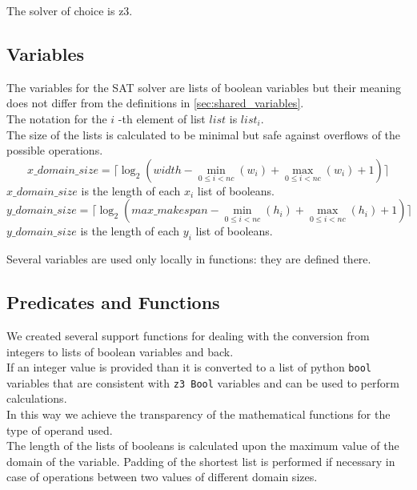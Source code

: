     The solver of choice is z3.


\subsection{Variables}\label{subsec:SAT_variables}
  The variables for the SAT solver are lists of boolean variables but their meaning does not differ from the 
  definitions in \ref{sec:shared_variables}.\\

  The notation for the \(i\) -th element of list 
  \(list\)  is \(list_i\).\\

  The size of the lists is calculated to be minimal but safe against overflows of the possible operations.
  \begin{equation*}
    x\_domain\_size = \lceil \log_2 (width - \min_{0 \leq i < nc} (w_i) + \max_{0 \leq i < nc}(w_i) + 1) \rceil
  \end{equation*}
  \( x\_domain\_size \) is the length of each \(x_i\) list of booleans.
  \begin{equation*}
    y\_domain\_size = \lceil \log_2 (max\_makespan - \min_{0 \leq i < nc} (h_i) + \max_{0 \leq i < nc}(h_i) + 1) \rceil
  \end{equation*}
  \(y\_domain\_size\) is the length of each \(y_i\) list of booleans.

  Several variables are used only locally in functions: they are defined there.\\


\subsection{Predicates and Functions}\label{subsec:SAT_predicates}
  We created several support functions for dealing with the conversion from integers to lists of
  boolean variables and back.\\
  If an integer value is provided than it is converted to a list of python \texttt{bool} variables
  that are consistent with 
  \texttt{z3 Bool} variables and can be used to perform calculations.\\
  In this way we achieve the transparency of the mathematical functions for the type of operand 
  used.\\
  The length of the lists of booleans is calculated upon the maximum value of the domain of the
  variable. Padding of the shortest list is performed if necessary in case of operations between
  two values of different domain sizes. \\

